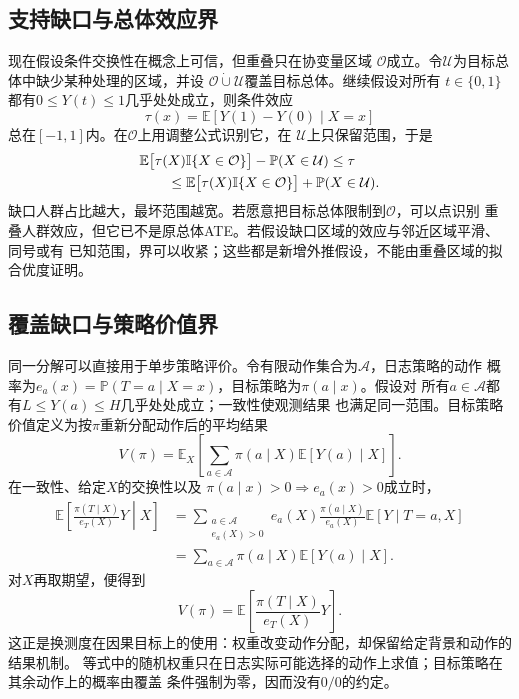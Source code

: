 \subsection{支持缺口与总体效应界}

现在假设条件交换性在概念上可信，但重叠只在协变量区域
\(\mathcal{O}\)成立。令\(\mathcal{U}\)为目标总体中缺少某种处理的区域，并设
\(\mathcal{O}\mathbin{\dot\cup}\mathcal{U}\)覆盖目标总体。继续假设对所有
\(t\in\{0,1\}\)都有\(0\leq Y(t)\leq1\)几乎处处成立，则条件效应
\[
  \tau(x)=\mathbb{E}[Y(1)-Y(0)\mid X=x]
\]
总在\([-1,1]\)内。在\(\mathcal{O}\)上用调整公式识别它，在
\(\mathcal{U}\)上只保留范围，于是
\begin{align}
  &\mathbb{E}\bigl[
    \tau(X)\mathbb{I}\{X\in\mathcal{O}\}
  \bigr]
  -\mathbb{P}(X\in\mathcal{U})
  \leq \tau \notag\\
  &\qquad\leq
  \mathbb{E}\bigl[
    \tau(X)\mathbb{I}\{X\in\mathcal{O}\}
  \bigr]
  +\mathbb{P}(X\in\mathcal{U}).
  \label{eq:causal-overlap-gap-bounds}
\end{align}
缺口人群占比越大，最坏范围越宽。若愿意把目标总体限制到\(\mathcal{O}\)，可以点识别
重叠人群效应，但它已不是原总体ATE。若假设缺口区域的效应与邻近区域平滑、同号或有
已知范围，界可以收紧；这些都是新增外推假设，不能由重叠区域的拟合优度证明。

\subsection{覆盖缺口与策略价值界}

同一分解可以直接用于单步策略评价。令有限动作集合为\(\mathcal{A}\)，日志策略的动作
概率为\(e_a(x)=\mathbb{P}(T=a\mid X=x)\)，目标策略为\(\pi(a\mid x)\)。假设对
所有\(a\in\mathcal{A}\)都有\(L\leq Y(a)\leq H\)几乎处处成立；一致性使观测结果
也满足同一范围。目标策略价值定义为按\(\pi\)重新分配动作后的平均结果
\[
  V(\pi)
  =
  \mathbb{E}_X\left[
    \sum_{a\in\mathcal{A}}\pi(a\mid X)\mathbb{E}[Y(a)\mid X]
  \right].
\]
在一致性、给定\(X\)的交换性以及
\(\pi(a\mid x)>0\Longrightarrow e_a(x)>0\)成立时，
\[
\begin{aligned}
  \mathbb{E}\left[
    \frac{\pi(T\mid X)}{e_T(X)}Y
    \middle|X
  \right]
  &=
  \sum_{\substack{a\in\mathcal{A}\\ e_a(X)>0}}
  e_a(X)\frac{\pi(a\mid X)}{e_a(X)}
  \mathbb{E}[Y\mid T=a,X]\\
  &=
  \sum_{a\in\mathcal{A}}
  \pi(a\mid X)\mathbb{E}[Y(a)\mid X].
\end{aligned}
\]
对\(X\)再取期望，便得到
\begin{equation}
  V(\pi)
  =
  \mathbb{E}\left[
    \frac{\pi(T\mid X)}{e_T(X)}Y
  \right].
  \label{eq:causal-policy-value-weighting}
\end{equation}
这正是换测度在因果目标上的使用：权重改变动作分配，却保留给定背景和动作的结果机制。
等式中的随机权重只在日志实际可能选择的动作上求值；目标策略在其余动作上的概率由覆盖
条件强制为零，因而没有\(0/0\)的约定。


